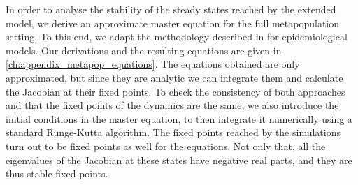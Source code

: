 \documentclass[../thesis.tex]{subfiles}
\begin{document}
In order to analyse the stability of the steady states reached by the extended model, we
derive an approximate master equation for the full metapopulation setting. To this end,
we adapt the methodology described in
\cite{SattenspielStructuredEpidemic1995,BalcanModelingSpatial2010} for epidemiological
models. Our derivations and the resulting equations are given in
\cref{ch:appendix_metapop_equations}. The equations obtained are only approximated, but
since they are analytic we can integrate them and calculate the Jacobian at their fixed
points. To check the consistency of both approaches and that the fixed points of the
dynamics are the same, we also introduce the initial conditions in the master equation,
to then integrate it numerically using a standard Runge-Kutta algorithm. The fixed
points reached by the simulations turn out to be fixed points as well for the equations.
Not only that, all the eigenvalues of the Jacobian at these states have negative real
parts, and they are thus stable fixed points.
\end{document}
